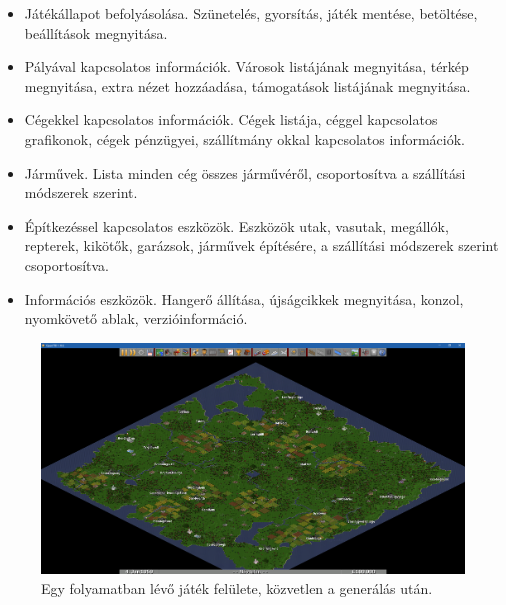 \begin{itemize}
	\item Játékállapot befolyásolása. Szünetelés, gyorsítás, játék mentése, betöltése, beállítások megnyitása.
	\item Pályával kapcsolatos információk. Városok listájának megnyitása, térkép megnyitása, extra nézet hozzáadása, támogatások listájának megnyitása.
	\item Cégekkel kapcsolatos információk. Cégek listája, céggel kapcsolatos grafikonok, cégek pénzügyei, szállítmány okkal kapcsolatos információk.
	\item Járművek. Lista minden cég összes járművéről, csoportosítva a szállítási módszerek szerint.
	\item Építkezéssel kapcsolatos eszközök. Eszközök utak, vasutak, megállók, repterek, kikötők, garázsok, járművek építésére, a szállítási módszerek szerint csoportosítva.
	\item Információs eszközök. Hangerő állítása, újságcikkek megnyitása, konzol, nyomkövető ablak, verzióinformáció.
\end{itemize}

\begin{figure}
	\centering
	\includegraphics[scale=0.3]{images/palya.png}
	\caption{Egy folyamatban lévő játék felülete, közvetlen a generálás után.}
	\label{fig:palya}
\end{figure}


